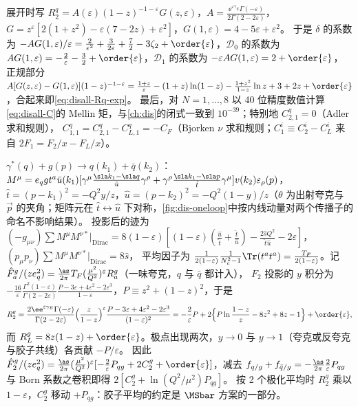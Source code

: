 \begin{example}
展开时写 $R^q_2=A(\varepsilon)(1-z)^{-1-\varepsilon}G(z,\varepsilon)$，$A=\frac{\ee^{\varepsilon\gamma_E}\Gamma(-\varepsilon)}{2\Gamma(2-2\varepsilon)}$，$G=z^\varepsilon[2(1+z^2)-\varepsilon(7-2z)+\varepsilon^2]$，$G(1,\varepsilon)=4-5\varepsilon+\varepsilon^2$。
于是 $\delta$ 的系数为 $-AG(1,\varepsilon)/\varepsilon=\frac2{\varepsilon^2}+\frac3{2\varepsilon}+\frac72-3\zeta_2+\order{\varepsilon}$，$\mathcal D_0$ 的系数为 $AG(1,\varepsilon)=-\frac2\varepsilon-\frac32+\order{\varepsilon}$，$\mathcal D_1$ 的系数为 $-\varepsilon AG(1,\varepsilon)=2+\order{\varepsilon}$，
正规部分 $A[G(z,\varepsilon)-G(1,\varepsilon)](1-z)^{-1-\varepsilon}=\frac{1+z}\varepsilon-(1+z)\ln(1-z)-\frac{1+z^2}{1-z}\ln z+3+2z+\order{\varepsilon}$，合起来即\cref{eq:disall-Rq-exp}。
最后，对 $N=1,\dots,8$ 以 40 位精度数值计算\cref{eq:disall-C}的 Mellin 矩，与\cref{ch:dis}的闭式一致到 $10^{-39}$；特别地 $C^q_{2,1}=0$（Adler 求和规则），   %
$C^q_{1,1}=C^q_{2,1}-C^q_{L,1}=-C_F$（Bjorken $\nu$ 求和规则；$C_1^i\equiv C_2^i-C_L^i$ 来自 $2F_1=F_2/x-F_L/x$）。
\end{example}

\begin{example}[光子—胶子融合]\label{ex:disall-gluon}
$\gamma^*(q)+g(p)\to q(k_1)+\bar q(k_2)$：$M^\mu=e_qgt^a\bar u(k_1)[\gamma^\mu\frac{\sla k_1-\sla q}{\hat u}\gamma^\rho+\gamma^\rho\frac{\sla k_1-\sla p}{\hat t}\gamma^\mu]v(k_2)\varepsilon_\rho(p)$，
$\hat t=(p-k_1)^2=-Q^2y/z$，$\hat u=(p-k_2)^2=-Q^2(1-y)/z$（$\theta$ 为出射夸克与 $\vec p$ 的夹角；矩阵元在 $\hat t\leftrightarrow\hat u$ 下对称，\cref{fig:dis-oneloop}中按内线动量对两个传播子的命名不影响结果）。
投影后的迹为 $(-g_{\mu\nu})\sum M^\mu M^{\nu*}|_{\mathrm{Dirac}}=8(1-\varepsilon)[(1-\varepsilon)(\frac{\hat u}{\hat t}+\frac{\hat t}{\hat u})-\frac{2\hat sQ^2}{\hat t\hat u}-2\varepsilon]$，$(p_\mu p_\nu)\sum M^\mu M^{\nu*}|_{\mathrm{Dirac}}=8\hat s$，
平均因子为 $\frac1{2(1-\varepsilon)}\frac1{N_c^2-1}\Tr(t^at^a)=\frac{T_F}{2(1-\varepsilon)}$。记 $\hat F^g_a/(ze_q^2)=\frac{\as}{2\pi}T_F(\frac{\mu^2}{Q^2})^\varepsilon R^g_a$（一味夸克，$q$ 与 $\bar q$ 都计入），
$F_2$ 投影的 $y$ 积分为 $-\frac{16}\varepsilon\frac{\Gamma^2(1-\varepsilon)}{\Gamma(2-2\varepsilon)}\frac{P-3\varepsilon+4\varepsilon^2-2\varepsilon^3}{1-\varepsilon}$，$P\equiv z^2+(1-z)^2$，于是
\begin{equation*}
R^g_2=\frac{2\ee^{\varepsilon\gamma_E}\Gamma(-\varepsilon)}{\Gamma(2-2\varepsilon)}\Big(\frac z{1-z}\Big)^\varepsilon\frac{P-3\varepsilon+4\varepsilon^2-2\varepsilon^3}{(1-\varepsilon)^2}
=-\frac2\varepsilon P+2\Big\{P\ln\frac{1-z}z-8z^2+8z-1\Big\}+\order{\varepsilon},   %
\end{equation*}
而 $R^g_L=8z(1-z)+\order{\varepsilon}$。极点出现两次，$y\to0$ 与 $y\to1$（夸克或反夸克与胶子共线）各贡献 $-P/\varepsilon$。
因此 $\hat F^g_2/(ze_q^2)=\frac{\as}{2\pi}(\frac{\mu^2}{Q^2})^\varepsilon[-\frac2\varepsilon P_{qg}+2C_2^g+\order{\varepsilon}]$，减去 $f_{q/g}+f_{\bar q/g}=-\frac{\as}{2\pi}\frac2\varepsilon P_{qg}$ 与 Born 系数之卷积即得 $2[C_2^g+\ln(Q^2/\mu^2)P_{qg}]$。
按 2 个极化平均时 $R^g_2$ 乘以 $1-\varepsilon$，$C_2^g$ 移动 $+P_{qg}$：胶子平均的约定是 $\MSbar$ 方案的一部分。
\end{example}

